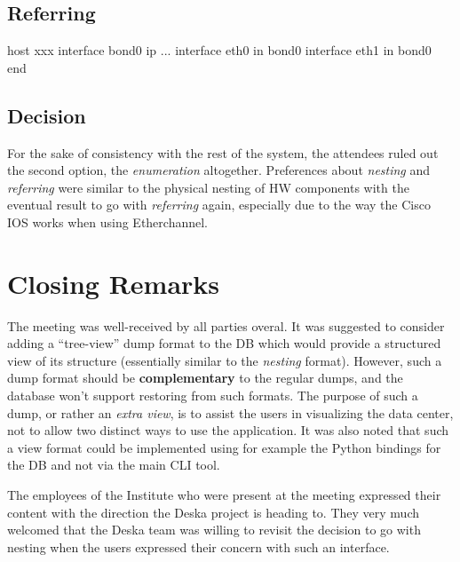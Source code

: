 \documentclass[12pt]{article}
\begin{document}
\subsection{Referring}
\begin{listing}{1}
host xxx
    interface bond0 ip ...
    interface eth0 in bond0
    interface eth1 in bond0
end
\end{listing}

\subsection{Decision}

For the sake of consistency with the rest of the system, the attendees ruled out
the second option, the {\em enumeration} altogether.  Preferences about {\em
nesting} and {\em referring} were similar to the physical nesting of HW
components with the eventual result to go with {\em referring} again, especially
due to the way the Cisco IOS works when using Etherchannel.

\section{Closing Remarks}

The meeting was well-received by all parties overal.  It was suggested to
consider adding a ``tree-view'' dump format to the DB which would provide a
structured view of its structure (essentially similar to the {\em nesting}
format).  However, such a dump format should be {\bf complementary} to the
regular dumps, and the database won't support restoring from such formats.  The
purpose of such a dump, or rather an {\em extra view}, is to assist the users in
visualizing the data center, not to allow two distinct ways to use the
application.  It was also noted that such a view format could be implemented
using for example the Python bindings for the DB and not via the main CLI tool.

The employees of the Institute who were present at the meeting expressed their
content with the direction the Deska project is heading to.  They very much
welcomed that the Deska team was willing to revisit the decision to go with
nesting when the users expressed their concern with such an interface.
\end{document}
